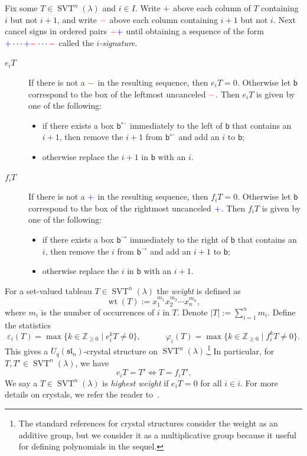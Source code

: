\documentclass[ALCO,ThmDefs,Unicode,epreuves]{cedram}
\newcommand{\bbb}{\mathsf{b}}
\newcommand{\abs}[1]{\lvert #1 \rvert}
\newcommand{\fsl}{\mathfrak{sl}}
\DeclareMathOperator{\wt}{wt} %
\DeclareMathOperator{\svt}{SVT} %
\newcommand{\ZZ}{\mathbb{Z}}
\newcommand{\bplus}{{\color{blue}+}}
\newcommand{\bminus}{{\color{red}-}}
\newcommand{\defn}[1]{{\color{darkred}\emph{#1}}} %
\begin{document}
\begin{defi}
\label{defn:svt_crystal_ops}
Fix some $T \in \svt^n(\lambda)$ and $i \in I$.
Write $\bplus$ above each column of $T$ containing $i$ but not $i+1$, and write $\bminus$ above each column containing $i+1$ but not $i$. Next cancel signs in ordered pairs $\bminus \bplus$ until obtaining a sequence of the form $\bplus \cdots \bplus \bminus \cdots \bminus$ called the \defn{$i$-signature}.
\begin{description}
\item[\defn{$e_i T$}] If there is not a $\bminus$ in the resulting sequence, then $e_i T = 0$. Otherwise let $\bbb$ correspond to the box of the leftmost uncanceled $\bminus$. Then $e_i T$ is given by one of the following:
\begin{itemize}
\item if there exists a box $\bbb^{\leftarrow}$ immediately to the left of $\bbb$ that contains an $i+1$, then remove the $i+1$ from $\bbb^{\leftarrow}$ and add an $i$ to $\bbb$;
\item otherwise replace the $i+1$ in $\bbb$ with an $i$.
\end{itemize}

\item[\defn{$f_i T$}] If there is not a $\bplus$ in the resulting sequence, then $f_i T = 0$. Otherwise let $\bbb$ correspond to the box of the rightmost uncanceled $\bplus$. Then $f_i T$ is given by one of the following:
\begin{itemize}
\item if there exists a box $\bbb^{\rightarrow}$ immediately to the right of $\bbb$ that contains an $i$, then remove the $i$ from $\bbb^{\rightarrow}$ and add an $i+1$ to $\bbb$;
\item otherwise replace the $i$ in $\bbb$ with an $i+1$.
\end{itemize}
\end{description}
\end{defi}

For a set-valued tableau $T \in \svt^n(\lambda)$ the \defn{weight} is defined as
\begin{equation}
\label{eq:weight_defn}
\wt(T) := x_1^{m_1} x_2^{m_2} \cdots x_n^{m_n},
\end{equation}
where $m_i$ is the number of occurrences of $i$ in $T$.
Denote $\abs{T} := \sum_{i=1}^n m_i$.
Define the statistics
\[
\varepsilon_i(T) = \max \{k \in \ZZ_{\geq 0} \mid e_i^k T \neq 0\},
\qquad\quad
\varphi_i(T) = \max \{k \in \ZZ_{\geq 0} \mid f_i^k T \neq 0\}.
\]
This gives a $U_q(\fsl_n)$-crystal structure on $\svt^n(\lambda)$.\footnote{The standard references for crystal structures consider the weight as an additive group, but we consider it as a multiplicative group because it useful for defining polynomials in the sequel.}
In particular, for $T, T' \in \svt^n(\lambda)$, we have
\[
e_i T = T' \Longleftrightarrow T = f_i T'.
\]
We say a $T \in \svt^n(\lambda)$ is \defn{highest weight} if $e_i T = 0$ for all $i \in i$.
For more details on crystals, we refer the reader to~\cite{BS17,K91}.
\end{document}
